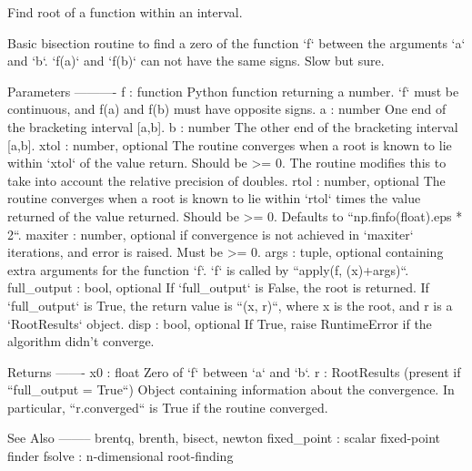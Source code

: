 \begin{DoxyVerb}Find root of a function within an interval.

Basic bisection routine to find a zero of the function `f` between the
arguments `a` and `b`. `f(a)` and `f(b)` can not have the same signs.
Slow but sure.

Parameters
----------
f : function
    Python function returning a number.  `f` must be continuous, and
    f(a) and f(b) must have opposite signs.
a : number
    One end of the bracketing interval [a,b].
b : number
    The other end of the bracketing interval [a,b].
xtol : number, optional
    The routine converges when a root is known to lie within `xtol` of the
    value return. Should be >= 0.  The routine modifies this to take into
    account the relative precision of doubles.
rtol : number, optional
    The routine converges when a root is known to lie within `rtol` times
    the value returned of the value returned. Should be >= 0. Defaults to
    ``np.finfo(float).eps * 2``.
maxiter : number, optional
    if convergence is not achieved in `maxiter` iterations, and error is
    raised.  Must be >= 0.
args : tuple, optional
    containing extra arguments for the function `f`.
    `f` is called by ``apply(f, (x)+args)``.
full_output : bool, optional
    If `full_output` is False, the root is returned.  If `full_output` is
    True, the return value is ``(x, r)``, where x is the root, and r is
    a `RootResults` object.
disp : bool, optional
    If True, raise RuntimeError if the algorithm didn't converge.

Returns
-------
x0 : float
    Zero of `f` between `a` and `b`.
r : RootResults (present if ``full_output = True``)
    Object containing information about the convergence.  In particular,
    ``r.converged`` is True if the routine converged.

See Also
--------
brentq, brenth, bisect, newton
fixed_point : scalar fixed-point finder
fsolve : n-dimensional root-finding\end{DoxyVerb}
 \hypertarget{namespacescipy_1_1optimize_1_1zeros_a46554b03f9304e126d5f4330727cd131}{}
